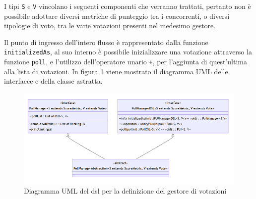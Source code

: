 \documentclass[12pt,a4paper,openright,twoside]{book}
\begin{document}
I tipi \texttt{S} e \texttt{V} vincolano i seguenti componenti che verranno trattati, pertanto non è possibile adottare diversi metriche di punteggio tra i concorrenti,
o diversi tipologie di voto, tra le varie votazioni presenti nel medesimo gestore.

Il punto di ingresso dell'intero flusso è rappresentato dalla funzione \texttt{initializedAs}, al suo interno è possibile inizializzare una votazione attraverso 
la funzione \texttt{poll}, e l'utilizzo dell'operatore unario \texttt{+}, per l'aggiunta di quest'ultima alla lista di votazioni.
In figura \ref{fig:pollManagerDSL} viene mostrato il diagramma UML delle interfacce e della classe astratta.
\vfill
\begin{center} 
\begin{figure}[H]
    \centering
     \includegraphics[width=1.1\linewidth]{figures/pollManagerDSL.png}
     \caption{Diagramma UML del \ac{dsl} per la definizione del gestore di votazioni}
    \label{fig:pollManagerDSL}
 \end{figure}
\end{center}
\vfill
 \newpage
\end{document}
